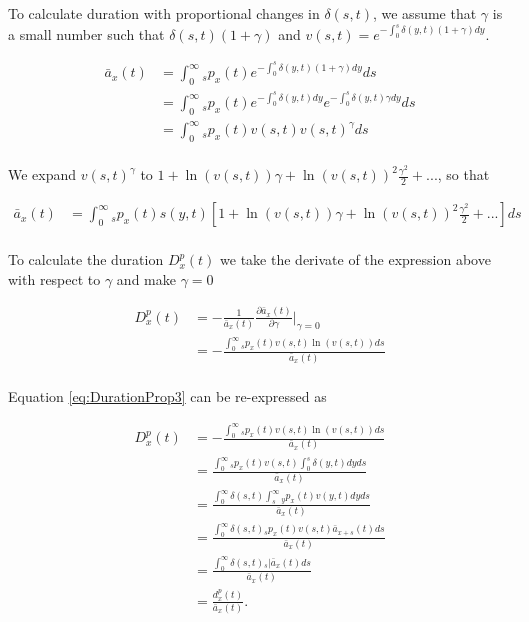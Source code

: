 \documentclass[12pt]{article}
\begin{document}
{To calculate duration with proportional changes in $\delta(s,t)$, we assume that $\gamma$ is a small number such that $\delta(s,t)(1+\gamma)$ and  ${v}(s,t)=e^{-\int_0^{s}  \delta(y,t)(1+\gamma)dy}$.


\begin{equation}\label{eq:DurationProp1}
\begin{split}
\bar{a} _x(t) &= \int_0^\infty {}_sp_x(t) e^{-\int_0^{s}\delta(y,t)(1+\gamma)dy}ds \\
&= \int_0^\infty {}_sp_x(t) e^{-\int_0^{s}\delta(y,t)dy}e^{-\int_0^{s}\delta(y,t)\gamma dy}ds \\
&= \int_0^\infty {}_sp_x(t) v(s,t)v(s,t)^{\gamma}ds \\
\end{split}
\end{equation}


We expand $v(s,t)^{\gamma}$ to $1+\ln(v(s,t)) \gamma+{\ln(v(s,t))}^2 \frac{\gamma^2}{2}+...$, so that


\begin{equation}\label{eq:DurationProp2}
\begin{split}
\bar{a}_x(t) &= \int_0^\infty {}_sp_x(t) s(y,t)[1+\ln(v(s,t)) \gamma+{\ln(v(s,t))}^2 \frac{\gamma^2}{2}+...]ds\\
\end{split}
\end{equation}


To calculate the duration ${D}^{p}_{x}(t)$ we take the derivate of the expression above with respect to $\gamma$ and make $\gamma=0$

\begin{equation}\label{eq:DurationProp3}
\begin{split}
{D}^{p}_{x}(t)&=-\frac{1}{\bar{a}_x(t)}\frac{\partial \bar{a}_x(t)}{\partial \gamma} \bigg\rvert_{\gamma=0} \\
&= -\frac{\int_0^\infty {}_sp_x(t) v(s,t) \ln(v(s,t))ds}{\bar{a}_x(t)} \\
\end{split}
\end{equation}


Equation \ref{eq:DurationProp3} can be re-expressed as 


\begin{equation}\label{eq:DurationProp4}
\begin{split}
{D}^{p}_{x}(t) &= -\frac{\int_0^\infty {}_sp_x(t) v(s,t) \ln(v(s,t))ds}{\bar{a}_x(t)}\\
&= \frac{\int_0^\infty {}_sp_x(t) v(s,t) \int_0^{s} \delta(y,t)dy ds }{\bar{a}_x(t)}\\
&= \frac{\int_0^\infty \delta(s,t)  \int_{s}^{\infty} {}_{y}p_x(t) v(y,t)dy ds }{\bar{a}_x(t)}\\
&= \frac{\int_0^\infty \delta(s,t) {}_sp_x(t) v(s,t) \bar{a}_{x+s}(t)  ds }{\bar{a}_x(t)}\\
&= \frac{\int_0^\infty \delta(s,t) {}_s|\bar{a}_x(t) ds}{\bar{a}_x(t)} \\
&= \frac{{d}^{p}_{x}(t)}{\bar{a}_x(t)}.
\end{split}
\end{equation}



}
\end{document}
